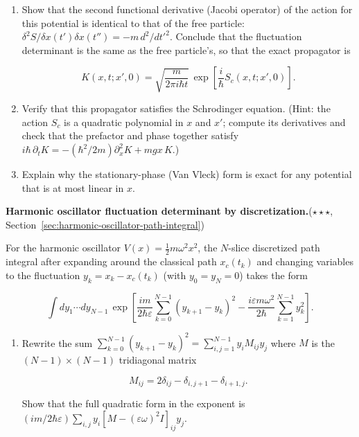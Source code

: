 \begin{problemset}
\begin{enumerate}
\item[(b)] Show that the second functional derivative (Jacobi operator) of the action for this potential is identical to that of the free particle: $\delta^2 S/\delta x(t')\delta x(t'') = -m\,d^2/dt'^2$. Conclude that the fluctuation determinant is the same as the free particle's, so that the exact propagator is
\begin{linenomath}
\begin{equation}
K(x,t;x',0) = \sqrt{\frac{m}{2\pi i\hbar t}}\,
\exp\left[\frac{i}{\hbar}S_c(x,t;x',0)\right].
\end{equation}
\end{linenomath}

\item[(c)] Verify that this propagator satisfies the Schrodinger equation. (Hint: the action $S_c$ is a quadratic polynomial in $x$ and $x'$; compute its derivatives and check that the prefactor and phase together satisfy $i\hbar\,\partial_t K = -(\hbar^2/2m)\partial_x^2 K + mgx\,K$.)
\item[(d)] Explain why the stationary-phase (Van Vleck) form is exact for any potential that is at most linear in $x$.
\end{enumerate}

\item[5.] \textbf{Harmonic oscillator fluctuation determinant by discretization.}\quad($\star\star\star$, Section~\ref{sec:harmonic-oscillator-path-integral})

For the harmonic oscillator $V(x) = \frac{1}{2}m\omega^2 x^2$, the $N$-slice discretized path integral after expanding around the classical path $x_c(t_k)$ and changing variables to the fluctuation $y_k = x_k - x_c(t_k)$ (with $y_0 = y_N = 0$) takes the form
\begin{linenomath}
\begin{equation}
\int dy_1\cdots dy_{N-1}\,
\exp\left[\frac{im}{2\hbar\varepsilon}\sum_{k=0}^{N-1}(y_{k+1}-y_k)^2 - \frac{i\varepsilon m\omega^2}{2\hbar}\sum_{k=1}^{N-1} y_k^2\right].
\end{equation}
\end{linenomath}

\begin{enumerate}
\item[(a)] Rewrite the sum $\sum_{k=0}^{N-1}(y_{k+1}-y_k)^2 = \sum_{i,j=1}^{N-1} y_i M_{ij} y_j$ where $M$ is the $(N-1)\times(N-1)$ tridiagonal matrix
\begin{linenomath}
\begin{equation}
M_{ij} = 2\delta_{ij} - \delta_{i,j+1} - \delta_{i+1,j}.
\end{equation}
\end{linenomath}
Show that the full quadratic form in the exponent is $(im/2\hbar\varepsilon)\sum_{i,j} y_i [M - (\varepsilon\omega)^2 I]_{ij} y_j$.


\end{enumerate}
\end{problemset}
